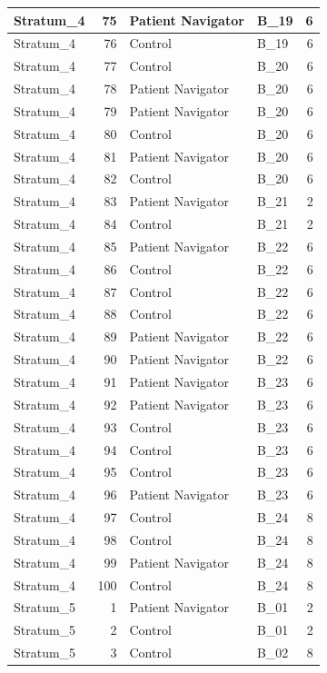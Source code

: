 \documentclass[
]{book}
\begin{document}
\begin{table}[H]
\begin{tabular}{l|r|l|l|r}
\hline
Stratum\_4 & 75 & Patient Navigator & B\_19 & 6\\
\hline
Stratum\_4 & 76 & Control & B\_19 & 6\\
\hline
Stratum\_4 & 77 & Control & B\_20 & 6\\
\hline
Stratum\_4 & 78 & Patient Navigator & B\_20 & 6\\
\hline
Stratum\_4 & 79 & Patient Navigator & B\_20 & 6\\
\hline
Stratum\_4 & 80 & Control & B\_20 & 6\\
\hline
Stratum\_4 & 81 & Patient Navigator & B\_20 & 6\\
\hline
Stratum\_4 & 82 & Control & B\_20 & 6\\
\hline
Stratum\_4 & 83 & Patient Navigator & B\_21 & 2\\
\hline
Stratum\_4 & 84 & Control & B\_21 & 2\\
\hline
Stratum\_4 & 85 & Patient Navigator & B\_22 & 6\\
\hline
Stratum\_4 & 86 & Control & B\_22 & 6\\
\hline
Stratum\_4 & 87 & Control & B\_22 & 6\\
\hline
Stratum\_4 & 88 & Control & B\_22 & 6\\
\hline
Stratum\_4 & 89 & Patient Navigator & B\_22 & 6\\
\hline
Stratum\_4 & 90 & Patient Navigator & B\_22 & 6\\
\hline
Stratum\_4 & 91 & Patient Navigator & B\_23 & 6\\
\hline
Stratum\_4 & 92 & Patient Navigator & B\_23 & 6\\
\hline
Stratum\_4 & 93 & Control & B\_23 & 6\\
\hline
Stratum\_4 & 94 & Control & B\_23 & 6\\
\hline
Stratum\_4 & 95 & Control & B\_23 & 6\\
\hline
Stratum\_4 & 96 & Patient Navigator & B\_23 & 6\\
\hline
Stratum\_4 & 97 & Control & B\_24 & 8\\
\hline
Stratum\_4 & 98 & Control & B\_24 & 8\\
\hline
Stratum\_4 & 99 & Patient Navigator & B\_24 & 8\\
\hline
Stratum\_4 & 100 & Control & B\_24 & 8\\
\hline
Stratum\_5 & 1 & Patient Navigator & B\_01 & 2\\
\hline
Stratum\_5 & 2 & Control & B\_01 & 2\\
\hline
Stratum\_5 & 3 & Control & B\_02 & 8\\

\end{tabular}
\end{table}
\end{document}
